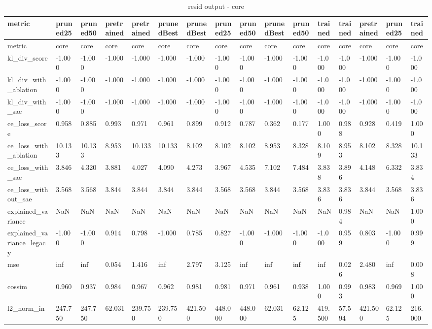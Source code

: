 \begin{table}
\caption{resid output - core}
\label{tab:resid_core}
\begin{tabular}{llllllllllllllll}
\toprule
metric & pruned25 & pruned50 & pretrained & pretrained & prunedBest & prunedBest & pruned25 & pruned50 & prunedBest & pruned50 & trained & trained & pretrained & pruned25 & trained \\
\midrule
metric & core & core & core & core & core & core & core & core & core & core & core & core & core & core & core \\
kl_div_score & -1.000 & -1.000 & -1.000 & -1.000 & -1.000 & -1.000 & -1.000 & -1.000 & -1.000 & -1.000 & -1.000 & -1.000 & -1.000 & -1.000 & -1.000 \\
kl_div_with_ablation & -1.000 & -1.000 & -1.000 & -1.000 & -1.000 & -1.000 & -1.000 & -1.000 & -1.000 & -1.000 & -1.000 & -1.000 & -1.000 & -1.000 & -1.000 \\
kl_div_with_sae & -1.000 & -1.000 & -1.000 & -1.000 & -1.000 & -1.000 & -1.000 & -1.000 & -1.000 & -1.000 & -1.000 & -1.000 & -1.000 & -1.000 & -1.000 \\
ce_loss_score & 0.958 & 0.885 & 0.993 & 0.971 & 0.961 & 0.899 & 0.912 & 0.787 & 0.362 & 0.177 & 1.000 & 0.988 & 0.928 & 0.419 & 1.000 \\
ce_loss_with_ablation & 10.133 & 10.133 & 8.953 & 10.133 & 10.133 & 8.102 & 8.102 & 8.102 & 8.953 & 8.328 & 8.109 & 8.953 & 8.102 & 8.328 & 10.133 \\
ce_loss_with_sae & 3.846 & 4.320 & 3.881 & 4.027 & 4.090 & 4.273 & 3.967 & 4.535 & 7.102 & 7.484 & 3.838 & 3.896 & 4.148 & 6.332 & 3.834 \\
ce_loss_without_sae & 3.568 & 3.568 & 3.844 & 3.844 & 3.844 & 3.844 & 3.568 & 3.568 & 3.844 & 3.568 & 3.836 & 3.836 & 3.844 & 3.568 & 3.836 \\
explained_variance & NaN & NaN & NaN & NaN & NaN & NaN & NaN & NaN & NaN & NaN & NaN & 0.984 & NaN & NaN & 1.000 \\
explained_variance_legacy & -1.000 & -1.000 & 0.914 & 0.798 & -1.000 & 0.785 & 0.827 & -1.000 & -1.000 & -1.000 & -1.000 & 0.959 & 0.803 & -1.000 & 0.999 \\
mse & inf & inf & 0.054 & 1.416 & inf & 2.797 & 3.125 & inf & inf & inf & inf & 0.026 & 2.480 & inf & 0.008 \\
cossim & 0.960 & 0.937 & 0.984 & 0.967 & 0.962 & 0.981 & 0.981 & 0.971 & 0.961 & 0.938 & 1.000 & 0.993 & 0.983 & 0.969 & 1.000 \\
l2_norm_in & 247.750 & 247.750 & 62.031 & 239.750 & 239.750 & 421.500 & 448.000 & 448.000 & 62.031 & 62.125 & 419.500 & 57.594 & 421.500 & 62.125 & 216.000 \\

\end{tabular}
\end{table}
